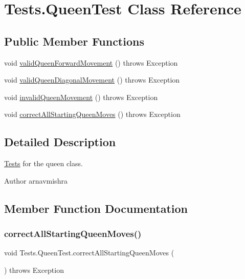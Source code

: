 \hypertarget{class_tests_1_1_queen_test}{}\section{Tests.\+Queen\+Test Class Reference}
\label{class_tests_1_1_queen_test}
\subsection*{Public Member Functions}
\begin{DoxyCompactItemize}
\item 
void \hyperlink{class_tests_1_1_queen_test_a8bec252c50587e572eaf3d36fb719d6f}{valid\+Queen\+Forward\+Movement} ()  throws Exception 
\item 
void \hyperlink{class_tests_1_1_queen_test_ae35369361ac4313f3bf86f111479fa75}{valid\+Queen\+Diagonal\+Movement} ()  throws Exception 
\item 
void \hyperlink{class_tests_1_1_queen_test_a0948894af0233e52a11873b7506674bb}{invalid\+Queen\+Movement} ()  throws Exception 
\item 
void \hyperlink{class_tests_1_1_queen_test_a888740ec9527c4998b55eb32bd3c2315}{correct\+All\+Starting\+Queen\+Moves} ()  throws Exception 
\end{DoxyCompactItemize}


\subsection{Detailed Description}
\hyperlink{namespace_tests}{Tests} for the queen class. \begin{DoxyAuthor}{Author}
arnavmishra 
\end{DoxyAuthor}


\subsection{Member Function Documentation}
\hypertarget{class_tests_1_1_queen_test_a888740ec9527c4998b55eb32bd3c2315}{}\label{class_tests_1_1_queen_test_a888740ec9527c4998b55eb32bd3c2315} 
\subsubsection{\texorpdfstring{correct\+All\+Starting\+Queen\+Moves()}{correctAllStartingQueenMoves()}}
{\footnotesize\ttfamily void Tests.\+Queen\+Test.\+correct\+All\+Starting\+Queen\+Moves (\begin{DoxyParamCaption}{ }\end{DoxyParamCaption}) throws Exception}

